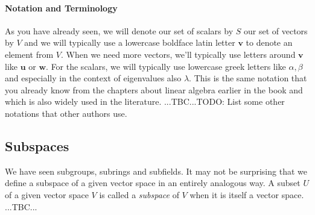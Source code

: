 \paragraph{Notation and Terminology}
As you have already seen, we will denote our set of scalars by $S$ our set of vectors by $V$ and we will typically use a lowercase boldface latin letter $\mathbf{v}$ to denote an element from $V$. When we need more vectors, we'll typically use letters around $\mathbf{v}$ like  $\mathbf{u}$ or $\mathbf{w}$. For the scalars, we will typically use lowercase greek letters like $\alpha, \beta$ and especially in the context of eigenvalues also $\lambda$. This is the same notation that you already know from the chapters about linear algebra earlier in the book and which is also widely used in the literature. ...TBC...TODO: List some other notations that other authors use.




\subsection{Subspaces} 
We have seen subgroups, subrings and subfields. It may not be surprising that we define a subspace of a given vector space in an entirely analogous way. A subset $U$ of a given vector space $V$ is called a \emph{subspace} of $V$ when it is itself a vector space. ...TBC...

